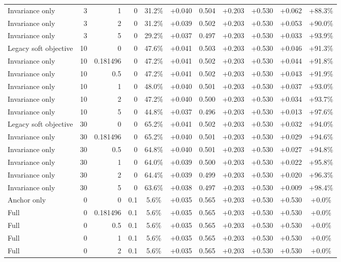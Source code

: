 \begin{table}[htbp]
\begin{tabular}{lrrrccccccc}
Invariance only & 3 & 1 & 0 & 31.2\% & +0.040 & 0.504 & +0.203 & +0.530 & +0.062 & +88.3\% \\
Invariance only & 3 & 2 & 0 & 31.2\% & +0.039 & 0.502 & +0.203 & +0.530 & +0.053 & +90.0\% \\
Invariance only & 3 & 5 & 0 & 29.2\% & +0.037 & 0.497 & +0.203 & +0.530 & +0.033 & +93.9\% \\
Legacy soft objective & 10 & 0 & 0 & 47.6\% & +0.041 & 0.503 & +0.203 & +0.530 & +0.046 & +91.3\% \\
Invariance only & 10 & 0.181496 & 0 & 47.2\% & +0.041 & 0.502 & +0.203 & +0.530 & +0.044 & +91.8\% \\
Invariance only & 10 & 0.5 & 0 & 47.2\% & +0.041 & 0.502 & +0.203 & +0.530 & +0.043 & +91.9\% \\
Invariance only & 10 & 1 & 0 & 48.0\% & +0.040 & 0.501 & +0.203 & +0.530 & +0.037 & +93.0\% \\
Invariance only & 10 & 2 & 0 & 47.2\% & +0.040 & 0.500 & +0.203 & +0.530 & +0.034 & +93.7\% \\
Invariance only & 10 & 5 & 0 & 44.8\% & +0.037 & 0.496 & +0.203 & +0.530 & +0.013 & +97.6\% \\
Legacy soft objective & 30 & 0 & 0 & 65.2\% & +0.041 & 0.502 & +0.203 & +0.530 & +0.032 & +94.0\% \\
Invariance only & 30 & 0.181496 & 0 & 65.2\% & +0.040 & 0.501 & +0.203 & +0.530 & +0.029 & +94.6\% \\
Invariance only & 30 & 0.5 & 0 & 64.8\% & +0.040 & 0.501 & +0.203 & +0.530 & +0.027 & +94.8\% \\
Invariance only & 30 & 1 & 0 & 64.0\% & +0.039 & 0.500 & +0.203 & +0.530 & +0.022 & +95.8\% \\
Invariance only & 30 & 2 & 0 & 64.4\% & +0.039 & 0.499 & +0.203 & +0.530 & +0.020 & +96.3\% \\
Invariance only & 30 & 5 & 0 & 63.6\% & +0.038 & 0.497 & +0.203 & +0.530 & +0.009 & +98.4\% \\
Anchor only & 0 & 0 & 0.1 & 5.6\% & +0.035 & 0.565 & +0.203 & +0.530 & +0.530 & +0.0\% \\
Full & 0 & 0.181496 & 0.1 & 5.6\% & +0.035 & 0.565 & +0.203 & +0.530 & +0.530 & +0.0\% \\
Full & 0 & 0.5 & 0.1 & 5.6\% & +0.035 & 0.565 & +0.203 & +0.530 & +0.530 & +0.0\% \\
Full & 0 & 1 & 0.1 & 5.6\% & +0.035 & 0.565 & +0.203 & +0.530 & +0.530 & +0.0\% \\
Full & 0 & 2 & 0.1 & 5.6\% & +0.035 & 0.565 & +0.203 & +0.530 & +0.530 & +0.0\% \\

\end{tabular}
\end{table}
